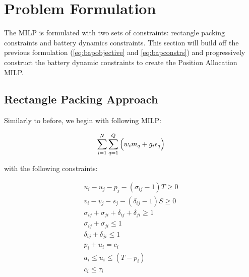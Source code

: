 \documentclass[letterpaper, 10pt, conference]{IEEEtran}
\begin{document}
%
\section{Problem Formulation}
\label{sec:problemformulation}
The MILP is formulated with two sets of constraints: rectangle packing constraints and battery dynamics constraints. This section will build off the previous formulation (\eqref{eq:bapobjective} and \eqref{eq:bapconstrs}) and progressively construct the battery dynamic constraints to create the Position Allocation MILP. 

\subsection{Rectangle Packing Approach}
Similarly to before, we begin with following MILP:

\begin{equation}\label{eq:objective}
    \sum_{i=1}^N \sum_{q=1}^Q \Big( w_i m_q + g_i \epsilon_q \Big) \\
\end{equation}

with the following constraints:

\begin{subequations}
\label{eq:packconstrs}
\begin{align}
    u_i - u_j - p_j - (\sigma_{ij} - 1)T \geq 0                      \label{subeq:time}         \\
    v_i - v_j - s_j - (\delta_{ij} - 1)S \geq 0                      \label{subeq:space}        \\
    \sigma_{ij} + \sigma_{ji} + \delta_{ij} + \delta_{ji} \geq 1     \label{subeq:valid_pos}    \\
    \sigma_{ij} + \sigma_{ji} \leq 1                                 \label{subeq:sigma}        \\
    \delta_{ij} + \delta_{ji} \leq 1                                 \label{subeq:delta}        \\
    p_i + u_i = c_i                                                  \label{subeq:detach}       \\
    a_i \leq u_i \leq (T - p_i)                                      \label{subeq:valid_starts} \\
    c_i \leq \tau_i                                                  \label{subeq:valid_depart} 
\end{align}
\end{subequations}
\end{document}
